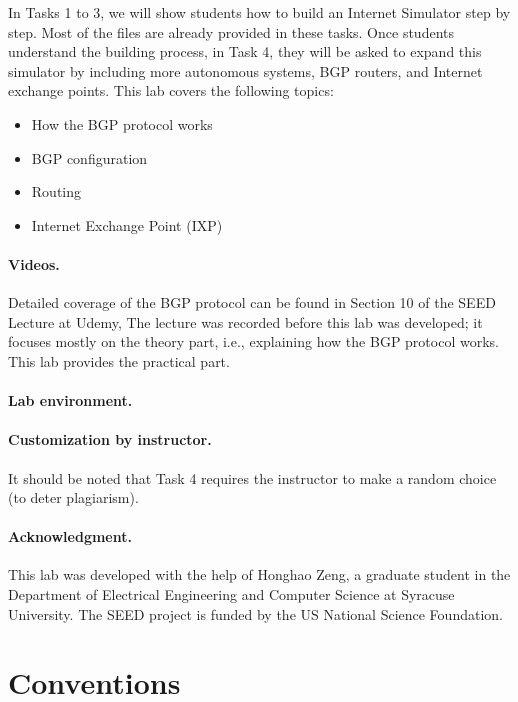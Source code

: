 In Tasks 1 to 3, we will show students how to build 
an Internet Simulator step by step. Most of the files are 
already provided in these tasks. Once students understand
the building process, in Task 4, 
they will be asked to expand this simulator by 
including more autonomous systems, BGP routers, 
and Internet exchange points. This lab covers the following topics:
\begin{itemize}[noitemsep]
\item How the BGP protocol works
\item BGP configuration
\item Routing 
\item Internet Exchange Point (IXP)
\end{itemize}


\paragraph{Videos.}
Detailed coverage of the BGP protocol can be found in 
Section 10 of the SEED Lecture at Udemy, \seedisvideo 
The lecture was recorded before this lab was developed; 
it focuses mostly on the theory part, i.e., explaining how the BGP protocol works. 
This lab provides the practical part.  


\paragraph{Lab environment.} 
\seedenvironmentB
\nodependency

\paragraph{Customization by instructor.} It should be noted that 
Task 4 requires the instructor to make a random choice (to deter
plagiarism).


\paragraph{Acknowledgment.} 
This lab was developed with the help of Honghao Zeng, a graduate student
in the Department of Electrical Engineering and Computer Science at Syracuse University.
The SEED project is funded by the US National Science Foundation. 



\section{Conventions} 

